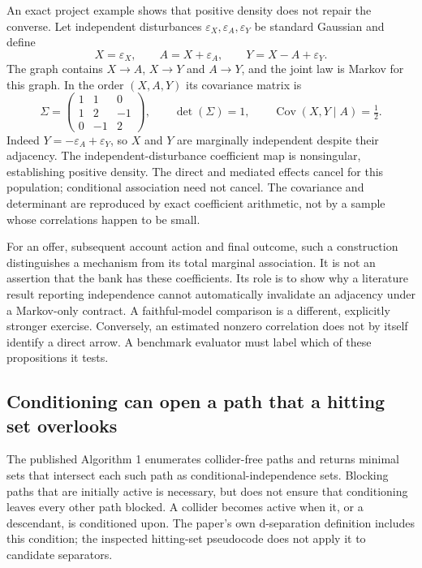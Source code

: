 An exact project example shows that positive density does not repair the
converse. Let independent disturbances $\varepsilon_X,\varepsilon_A,
\varepsilon_Y$ be standard Gaussian and define
\begin{equation}
 X=\varepsilon_X,\qquad A=X+\varepsilon_A,\qquad
 Y=X-A+\varepsilon_Y.
\label{exec17:validity-cancellation}
\end{equation}
The graph contains $X\to A$, $X\to Y$ and $A\to Y$, and the joint law is
Markov for this graph. In the order $(X,A,Y)$ its covariance matrix is
\begin{equation}
 \Sigma=\begin{pmatrix}1&1&0\\1&2&-1\\0&-1&2\end{pmatrix},
 \qquad \det(\Sigma)=1,\qquad
 \operatorname{Cov}(X,Y\mid A)=\tfrac12.
\label{exec17:validity-covariance}
\end{equation}
Indeed $Y=-\varepsilon_A+\varepsilon_Y$, so $X$ and $Y$ are marginally
independent despite their adjacency. The independent-disturbance coefficient
map is nonsingular, establishing positive density. The direct and mediated
effects cancel for this population; conditional association need not cancel.
The covariance and determinant are reproduced by exact coefficient arithmetic,
not by a sample whose correlations happen to be small.
\citep{exec17_advice_validity_exact}

For an offer, subsequent account action and final outcome, such a construction
distinguishes a mechanism from its total marginal association. It is not an
assertion that the bank has these coefficients. Its role is to show why a
literature result reporting independence cannot automatically invalidate an
adjacency under a Markov-only contract. A faithful-model comparison is a
different, explicitly stronger exercise. Conversely, an estimated nonzero
correlation does not by itself identify a direct arrow. A benchmark evaluator
must label which of these propositions it tests.

\subsection{Conditioning can open a path that a hitting set overlooks}

The published Algorithm 1 enumerates collider-free paths and returns minimal
sets that intersect each such path as conditional-independence sets. Blocking
paths that are initially active is necessary, but does not ensure that
conditioning leaves every other path blocked. A collider becomes active when
it, or a descendant, is conditioned upon. The paper's own d-separation
definition includes this condition; the inspected hitting-set pseudocode does
not apply it to candidate separators.\citep{exec17_benchmark_consistency}

